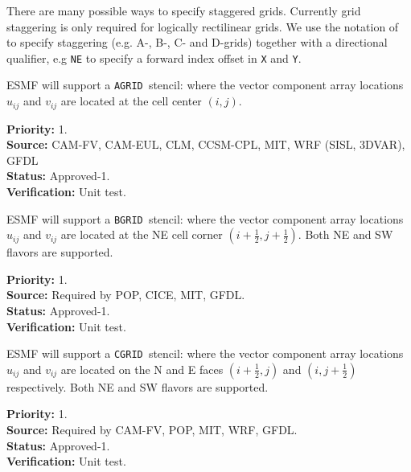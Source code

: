 There are many possible ways to specify staggered grids.  Currently
grid staggering is only required for logically rectilinear grids. We
use the notation of \cite{ref:a1966} to specify staggering (e.g. A-,
B-, C- and D-grids) together with a directional qualifier, e.g
\texttt{NE} to specify a forward index offset in \texttt{X} and
\texttt{Y}.

\newcommand{\agrid}{\texttt{AGRID~}}
\newcommand{\bgrid}{\texttt{BGRID~}}
\newcommand{\cgrid}{\texttt{CGRID~}}
\newcommand{\dgrid}{\texttt{DGRID~}}
\newcommand{\egrid}{\texttt{EGRID~}}

\sreq{\agrid}

ESMF will support a \agrid stencil: where the vector
component array locations $u_{ij}$ and $v_{ij}$ are located at the
cell center $(i,j)$.

\begin{reqlist}
{\bf Priority:} 1. \\ 
{\bf Source:} CAM-FV, CAM-EUL, CLM, CCSM-CPL, MIT, WRF (SISL, 3DVAR), GFDL \\
{\bf Status:} Approved-1. \\
{\bf Verification:} Unit test. 
\end{reqlist}

\sreq{\bgrid}

ESMF will support a \bgrid stencil: where the vector component array
locations $u_{ij}$ and $v_{ij}$ are located at the NE cell corner
$(i+\frac12,j+\frac12)$. Both NE and SW flavors are supported.

\begin{reqlist}
{\bf Priority:} 1.\\ 
{\bf Source:} Required by POP, CICE, MIT, GFDL. \\
{\bf Status:} Approved-1. \\
{\bf Verification:} Unit test.
\end{reqlist}

\sreq{\cgrid}

ESMF will support a \cgrid stencil: where the vector component array
locations $u_{ij}$ and $v_{ij}$ are located on the N and E faces
$(i+\frac12,j)$ and $(i,j+\frac12)$ respectively. Both NE and SW
flavors are supported.

\begin{reqlist}
{\bf Priority:} 1. \\ 
{\bf Source:} Required by CAM-FV, POP, MIT, WRF, GFDL. \\
{\bf Status:} Approved-1. \\
{\bf Verification:} Unit test.
\end{reqlist}

